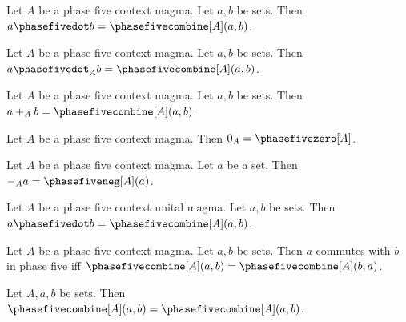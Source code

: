 \begin{proposition}\label{phase5_context_dot_explicit}
    Let $A$ be a phase five context magma.
    Let $a,b$ be sets.
    Then $a\phasefivedot b = \phasefivecombine[A](a,b)$.
\end{proposition}

\begin{proposition}\label{phase5_context_indexed_dot_explicit}
    Let $A$ be a phase five context magma.
    Let $a,b$ be sets.
    Then $a\phasefivedot_{A} b = \phasefivecombine[A](a,b)$.
\end{proposition}

\begin{proposition}\label{phase5_context_indexed_plus_explicit}
    Let $A$ be a phase five context magma.
    Let $a,b$ be sets.
    Then $a+_{A}b = \phasefivecombine[A](a,b)$.
\end{proposition}

\begin{proposition}\label{phase5_context_indexed_zero_explicit}
    Let $A$ be a phase five context magma.
    Then $0_{A} = \phasefivezero[A]$.
\end{proposition}

\begin{proposition}\label{phase5_context_indexed_negation_explicit}
    Let $A$ be a phase five context magma.
    Let $a$ be a set.
    Then $-_{A}a = \phasefiveneg[A](a)$.
\end{proposition}

\begin{proposition}\label{phase5_context_inherited}
    Let $A$ be a phase five context unital magma.
    Let $a,b$ be sets.
    Then $a\phasefivedot b = \phasefivecombine[A](a,b)$.
\end{proposition}

\begin{proposition}\label{phase5_context_nested}
    Let $A$ be a phase five context magma.
    Let $a,b$ be sets.
    Then $a$ commutes with $b$ in phase five iff
        $\phasefivecombine[A](a,b) = \phasefivecombine[A](b,a)$.
\end{proposition}

\begin{proposition}\label{phase5_context_explicit_unique}
    Let $A,a,b$ be sets.
    Then $\phasefivecombine[A](a,b) = \phasefivecombine[A](a,b)$.
\end{proposition}
